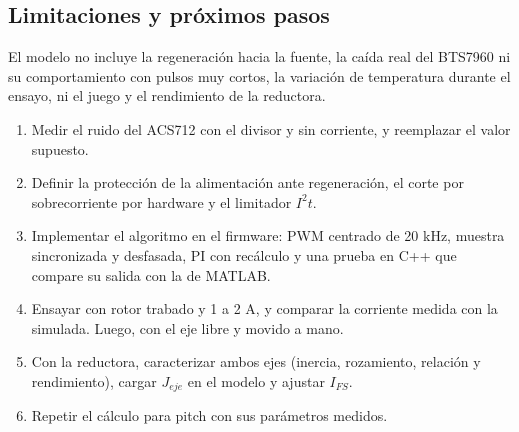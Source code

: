 \subsection{Limitaciones y próximos pasos}
\label{sec:cc_pasos}
El modelo no incluye la regeneración hacia la fuente, la caída real del BTS7960 ni su comportamiento con pulsos muy cortos, la variación de temperatura durante el ensayo, ni el juego y el rendimiento de la reductora.
\begin{enumerate}
\item Medir el ruido del ACS712 con el divisor y sin corriente, y reemplazar el valor supuesto.
\item Definir la protección de la alimentación ante regeneración, el corte por sobrecorriente por hardware y el limitador $I^2t$.
\item Implementar el algoritmo en el firmware: PWM centrado de 20 kHz, muestra sincronizada y desfasada, PI con recálculo y una prueba en C++ que compare su salida con la de MATLAB.
\item Ensayar con rotor trabado y 1 a 2 A, y comparar la corriente medida con la simulada. Luego, con el eje libre y movido a mano.
\item Con la reductora, caracterizar ambos ejes (inercia, rozamiento, relación y rendimiento), cargar $J_{eje}$ en el modelo y ajustar $I_{FS}$.
\item Repetir el cálculo para pitch con sus parámetros medidos.
\end{enumerate}
